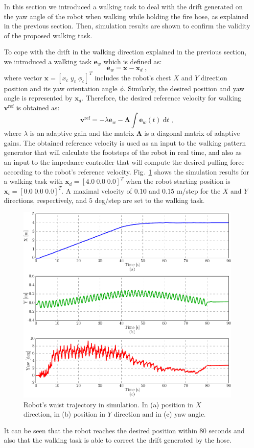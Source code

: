 In this section we introduced  a walking task to deal with the drift generated on the yaw angle of the robot when walking while holding the fire hose, as explained in the previous section.
%
Then, simulation results are shown to confirm the validity of the proposed walking task.



To cope with the drift in the walking direction explained in the previous section, we introduced a walking task $\mathbf{e}_w$ which is defined as:
%
\begin{equation}
\mathbf{e}_w = \mathbf{x} - \mathbf{x}_d \; ,
\label{ewalk}
\end{equation}
%
where vector $\mathbf{x} = [x_c \; y_c \; \phi_c]^T$ includes the robot's chest $X$ and $Y$ direction position and its yaw orientation angle $\phi$. Similarly, the desired position and yaw angle is represented by $\mathbf{x}_d$.
%
Therefore, the desired reference velocity for walking $\mathbf{v}^{\text{ref}}$ is obtained as:
%
\begin{equation}
\mathbf{v}^{\text{ref}} = -\lambda \mathbf{e}_{w} - \mathbf{\Lambda} \int \mathbf{e}_{w}(t)  \; \mathrm{d}t \; ,
\label{velwalk}
\end{equation}
%
where $\lambda$ is an adaptive gain and the matrix $\mathbf{\Lambda}$ is a diagonal matrix of adaptive gains. 
%
The obtained reference velocity is used as an input to the walking pattern generator that will calculate the footsteps of the robot in real time, and also as an input to the impedance controller that will compute the desired pulling force according to the robot's reference velocity.
%
Fig.~\ref{sim_graph} shows the simulation results for a walking task with $\mathbf{x}_d = [4.0 \; 0.0 \; 0.0]^T$ when the robot starting position is $\mathbf{x}_i = [0.0 \; 0.0 \; 0.0]^T$.
%
A maximal velocity of $0.10$ and $0.15$ m/step for the $X$ and $Y$ directions, respectively, and $5$ deg/step are set to the walking task.
%
%
\begin{figure}[t]
 \centering
 \includegraphics[height=0.40\textwidth]{./figures/sim_pos.pdf}
 \vspace{-3mm}
 \caption{Robot's waist trajectory in simulation. In (a) position in $X$ direction, in (b) position in $Y$ direction and in (c) yaw angle.}
 \label{sim_graph}
\end{figure}
%
%
It can be seen that the robot reaches the desired position within $80$ seconds and also that the walking task is able to correct the drift generated by the hose.
